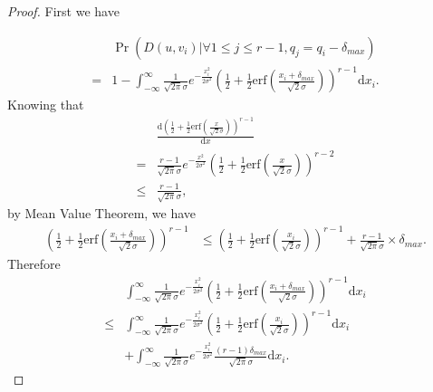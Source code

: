\begin{proof}
    First we have

    \begin{align*}
        &\Pr(D(u, v_i) | \forall 1 \le j \le r-1, q_j = q_i - \delta_{max}) \\
        = &1 - \int_{-\infty}^{\infty} \frac{1}{\sqrt{2 \pi}\sigma} e^{-\frac{x_i^2}{2\sigma^2}}
        \left(\frac{1}{2} + \frac{1}{2}\mathrm{erf}\left(\frac{x_i + \delta_{max}}{\sqrt{2}\sigma}\right)\right)^{r-1} \mathrm{d} x_i.
    \end{align*}
    Knowing that
    \begin{align*}
        & \frac{\mathrm{d} (\frac{1}{2} + \frac{1}{2} \mathrm{erf}(\frac{x}{\sqrt{2}\sigma}))^{r-1}}{\mathrm{d}x}\\
        = &\frac{r - 1}{\sqrt{2\pi}\sigma} e^{-\frac{x^2}{2\sigma^2}} \left(\frac{1}{2} + \frac{1}{2}\mathrm{erf}\left(\frac{x}{\sqrt{2}\sigma}\right)\right)^{r-2} \\
        \le &\frac{r-1}{\sqrt{2\pi}\sigma},
    \end{align*}
    by Mean Value Theorem, we have
    \begin{align*}
        \left(\frac{1}{2} + \frac{1}{2}\mathrm{erf}\left(\frac{x_i + \delta_{max}}{\sqrt{2}\sigma}\right)\right)^{r-1}
        &\le \left(\frac{1}{2} + \frac{1}{2}\mathrm{erf}\left(\frac{x_i}{\sqrt{2}\sigma}\right)\right)^{r-1}
        + \frac{r-1}{\sqrt{2\pi}\sigma} \times \delta_{max}.
    \end{align*}
    Therefore
    \begin{align*}
        & \int_{-\infty}^{\infty} \frac{1}{\sqrt{2 \pi}\sigma} e^{-\frac{x_i^2}{2\sigma^2}}
        \left(\frac{1}{2} + \frac{1}{2}\mathrm{erf}\left(\frac{x_i + \delta_{max}}{\sqrt{2}\sigma}\right)\right)^{r-1} \mathrm{d} x_i \\
        \le &\int_{-\infty}^{\infty} \frac{1}{\sqrt{2 \pi}\sigma} e^{-\frac{x_i^2}{2\sigma^2}}
        \left(\frac{1}{2} + \frac{1}{2}\mathrm{erf}\left(\frac{x_i}{\sqrt{2}\sigma}\right)\right)^{r-1} \mathrm{d} x_i \\
        & + \int_{-\infty}^{\infty} \frac{1}{\sqrt{2 \pi}\sigma} e^{-\frac{x_i^2}{2\sigma^2}}
        \frac{(r-1)\delta_{max}}{\sqrt{2\pi}\sigma}\mathrm{d} x_i.
    \end{align*}


\end{proof}
